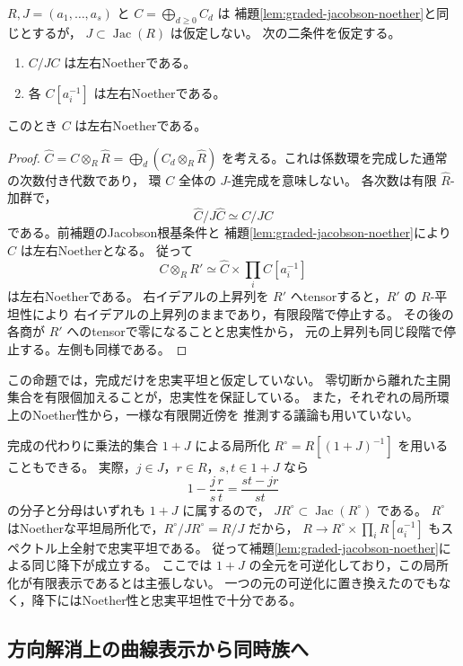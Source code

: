 \begin{proposition}\label{prop:noether-completion-punctured-gluing}
$R,J=(a_1,\ldots,a_s)$ と $C=\bigoplus_{d\ge0}C_d$ は
補題\ref{lem:graded-jacobson-noether}と同じとするが，
$J\subset\operatorname{Jac}(R)$ は仮定しない。
次の二条件を仮定する。
\begin{enumerate}
 \item $C/JC$ は左右Noetherである。
 \item 各 $C[a_i^{-1}]$ は左右Noetherである。
\end{enumerate}
このとき $C$ は左右Noetherである。
\end{proposition}
\begin{proof}
$\widehat C=C\otimes_R\widehat R=\bigoplus_d(C_d\otimes_R\widehat R)$
を考える。これは係数環を完成した通常の次数付き代数であり，
環 $C$ 全体の $J$-進完成を意味しない。
各次数は有限 $\widehat R$-加群で，
\[
 \widehat C/J\widehat C\simeq C/JC
\]
である。前補題のJacobson根基条件と
補題\ref{lem:graded-jacobson-noether}により $\widehat C$ は左右Noetherとなる。
従って
\[
 C\otimes_R R'\simeq
   \widehat C\times\prod_i C[a_i^{-1}]
\]
は左右Noetherである。
右イデアルの上昇列を $R'$ へtensorすると，$R'$ の $R$-平坦性により
右イデアルの上昇列のままであり，有限段階で停止する。
その後の各商が $R'$ へのtensorで零になることと忠実性から，
元の上昇列も同じ段階で停止する。左側も同様である。
\end{proof}

この命題では，完成だけを忠実平坦と仮定していない。
零切断から離れた主開集合を有限個加えることが，忠実性を保証している。
また，それぞれの局所環上のNoether性から，一様な有限開近傍を
推測する議論も用いていない。

\begin{remark}\label{rem:jacobson-localization-cover}
完成の代わりに乗法的集合 $1+J$ による局所化
$R^\circ=R[(1+J)^{-1}]$ を用いることもできる。
実際，$j\in J$，$r\in R$，$s,t\in1+J$ なら
\[
 1-\frac js\frac rt=\frac{st-jr}{st}
\]
の分子と分母はいずれも $1+J$ に属するので，
$JR^\circ\subset\operatorname{Jac}(R^\circ)$ である。
$R^\circ$ はNoetherな平坦局所化で，$R^\circ/JR^\circ=R/J$ だから，
$R\to R^\circ\times\prod_iR[a_i^{-1}]$ もスペクトル上全射で忠実平坦である。
従って補題\ref{lem:graded-jacobson-noether}による同じ降下が成立する。
ここでは $1+J$ の全元を可逆化しており，この局所化が有限表示であるとは主張しない。
一つの元の可逆化に置き換えたのでもなく，降下にはNoether性と忠実平坦性で十分である。
\end{remark}

\subsection{方向解消上の曲線表示から同時族へ}

